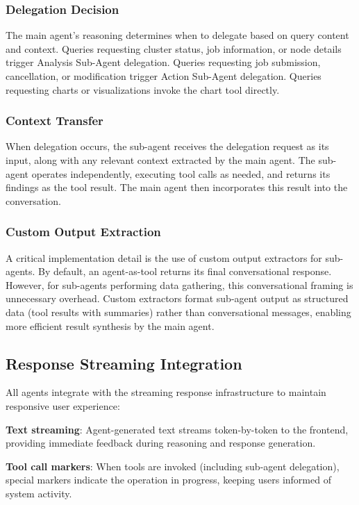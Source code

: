 \subsubsection{Delegation Decision}

The main agent's reasoning determines when to delegate based on query content and context. Queries requesting cluster status, job information, or node details trigger Analysis Sub-Agent delegation. Queries requesting job submission, cancellation, or modification trigger Action Sub-Agent delegation. Queries requesting charts or visualizations invoke the chart tool directly.

\subsubsection{Context Transfer}

When delegation occurs, the sub-agent receives the delegation request as its input, along with any relevant context extracted by the main agent. The sub-agent operates independently, executing tool calls as needed, and returns its findings as the tool result. The main agent then incorporates this result into the conversation.

\subsubsection{Custom Output Extraction}

A critical implementation detail is the use of custom output extractors for sub-agents. By default, an agent-as-tool returns its final conversational response. However, for sub-agents performing data gathering, this conversational framing is unnecessary overhead. Custom extractors format sub-agent output as structured data (tool results with summaries) rather than conversational messages, enabling more efficient result synthesis by the main agent.

\subsection{Response Streaming Integration}

All agents integrate with the streaming response infrastructure to maintain responsive user experience:

\textbf{Text streaming}: Agent-generated text streams token-by-token to the frontend, providing immediate feedback during reasoning and response generation.

\textbf{Tool call markers}: When tools are invoked (including sub-agent delegation), special markers indicate the operation in progress, keeping users informed of system activity.

